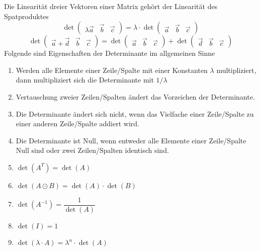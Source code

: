 Die Linearität dreier Vektoren einer Matrix gehört der Linearität des Spatproduktes
\begin{equation}
\boxed{\det\begin{pmatrix}\lambda\overrightarrow{a}&\overrightarrow{b}&\overrightarrow{c}\end{pmatrix}=\lambda\cdot \det\begin{pmatrix}\overrightarrow{a}&\overrightarrow{b}&\overrightarrow{c}\end{pmatrix}}
\end{equation}
\begin{equation}
\boxed{\det\begin{pmatrix}\overrightarrow{a}+\overrightarrow{d}&\overrightarrow{b}&\overrightarrow{c}\end{pmatrix}=\det\begin{pmatrix}\overrightarrow{a}&\overrightarrow{b}&\overrightarrow{c}\end{pmatrix}+\det\begin{pmatrix}\overrightarrow{d}&\overrightarrow{b}&\overrightarrow{c}\end{pmatrix}}
\end{equation}
Folgende sind Eigenschaften der Determinante im allgemeinen Sinne
\begin{enumerate}[$(i)$]
\item Werden alle Elemente einer Zeile/Spalte mit einer Konstanten $\lambda$ multipliziert, dann multipliziert sich die Determinante mit $1/\lambda$
\item Vertauschung zweier Zeilen/Spalten ändert das Vorzeichen der Determinante.
\item Die Determinante ändert sich nicht, wenn das Vielfache einer Zeile/Spalte zu einer anderen Zeile/Spalte addiert wird.
\item Die Determinante ist Null, wenn entweder alle Elemente einer Zeile/Spalte Null sind oder zwei Zeilen/Spalten identisch sind.
\item $\det\left(A^T\right)=\det\left(A\right)$
\item $\det\left(A\odot B\right)=\det\left(A\right)\cdot \det\left(B\right)$
\item $\det\left(A^{-1}\right)=\dfrac{1}{\det\left(A\right)}$
\item $\det\left(I\right)=1$
\item $\det\left(\lambda\cdot A\right)=\lambda^n\cdot \det\left(A\right)$
\end{enumerate}